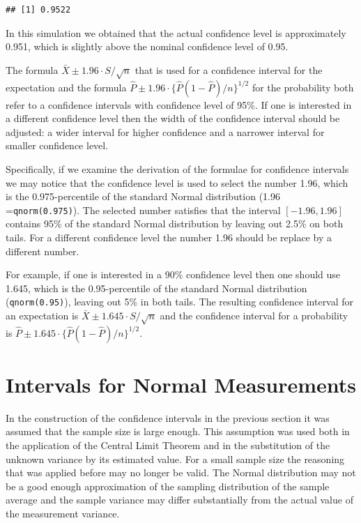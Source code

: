 \documentclass[]{krantz}
\theoremstyle{definition}
\theoremstyle{definition}
\theoremstyle{definition}
\theoremstyle{remark}
\begin{document}
\begin{verbatim}
## [1] 0.9522
\end{verbatim}

In this simulation we obtained that the actual confidence level is
approximately 0.951, which is slightly above the nominal confidence
level of 0.95.

The formula \(\bar X \pm 1.96 \cdot S/\sqrt{n}\) that is used for a
confidence interval for the expectation and the formula
\(\hat P \pm 1.96 \cdot \{\hat P (1-\hat P)/n\}^{1/2}\) for the
probability both refer to a confidence intervals with confidence level
of 95\%. If one is interested in a different confidence level then the
width of the confidence interval should be adjusted: a wider interval
for higher confidence and a narrower interval for smaller confidence
level.

Specifically, if we examine the derivation of the formulae for
confidence intervals we may notice that the confidence level is used to
select the number 1.96, which is the 0.975-percentile of the standard
Normal distribution (1.96 =\texttt{qnorm(0.975)}). The selected number
satisfies that the interval \([-1.96,1.96]\) contains 95\% of the
standard Normal distribution by leaving out 2.5\% on both tails. For a
different confidence level the number 1.96 should be replace by a
different number.

For example, if one is interested in a 90\% confidence level then one
should use 1.645, which is the 0.95-percentile of the standard Normal
distribution (\texttt{qnorm(0.95)}), leaving out 5\% in both tails. The
resulting confidence interval for an expectation is
\(\bar X \pm 1.645 \cdot S/\sqrt{n}\) and the confidence interval for a
probability is \(\hat P \pm 1.645 \cdot \{\hat P (1-\hat P)/n\}^{1/2}\).

\section{Intervals for Normal Measurements}\label{CInormal}

In the construction of the confidence intervals in the previous section
it was assumed that the sample size is large enough. This assumption was
used both in the application of the Central Limit Theorem and in the
substitution of the unknown variance by its estimated value. For a small
sample size the reasoning that was applied before may no longer be
valid. The Normal distribution may not be a good enough approximation of
the sampling distribution of the sample average and the sample variance
may differ substantially from the actual value of the measurement
variance.
\end{document}
